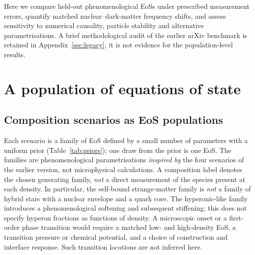 \documentclass[11pt,a4paper]{article}
\begin{document}
Here we compare held-out phenomenological EoSs under prescribed measurement errors, quantify matched nuclear--dark-matter frequency shifts, and assess sensitivity to numerical causality, particle stability and alternative parametrisations. A brief methodological audit of the earlier arXiv benchmark is retained in Appendix~\ref{sec:legacy}; it is not evidence for the population-level results.

\section{A population of equations of state}\label{sec:pop}
\subsection{Composition scenarios as EoS populations}
Each scenario is a family of EoS defined by a small number of parameters with a uniform prior (Table~\ref{tab:priors}); one draw from the prior is one EoS. The families are phenomenological parametrisations \emph{inspired by} the four scenarios of the earlier version, not microphysical calculations. A composition label denotes the chosen generating family, \emph{not} a direct measurement of the species present at each density. In particular, the self-bound strange-matter family is \emph{not} a family of hybrid stars with a nuclear envelope and a quark core. The hyperonic-like family introduces a phenomenological softening and subsequent stiffening; this does not specify hyperon fractions as functions of density. A microscopic onset or a first-order phase transition would require a matched low- and high-density EoS, a transition pressure or chemical potential, and a choice of construction and interface response. Such transition locations are not inferred here.
\end{document}
